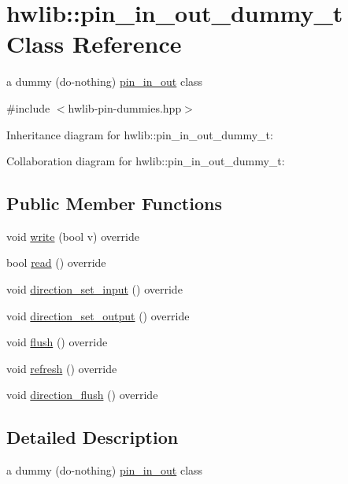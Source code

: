 \hypertarget{classhwlib_1_1pin__in__out__dummy__t}{}\section{hwlib\+:\+:pin\+\_\+in\+\_\+out\+\_\+dummy\+\_\+t Class Reference}
\label{classhwlib_1_1pin__in__out__dummy__t}


a dummy (do-\/nothing) \hyperlink{classhwlib_1_1pin__in__out}{pin\+\_\+in\+\_\+out} class  




{\ttfamily \#include $<$hwlib-\/pin-\/dummies.\+hpp$>$}



Inheritance diagram for hwlib\+:\+:pin\+\_\+in\+\_\+out\+\_\+dummy\+\_\+t\+:


Collaboration diagram for hwlib\+:\+:pin\+\_\+in\+\_\+out\+\_\+dummy\+\_\+t\+:
\subsection*{Public Member Functions}
\begin{DoxyCompactItemize}
\item 
void \hyperlink{classhwlib_1_1pin__in__out__dummy__t_ae5ed2ec46aee911a4c3827688cbf72b8}{write} (bool v) override
\item 
bool \hyperlink{classhwlib_1_1pin__in__out__dummy__t_a6cc3d99badf70aae8b076594ffd5f465}{read} () override
\item 
void \hyperlink{classhwlib_1_1pin__in__out__dummy__t_af5f3e57b6496dc0e523fe6000e2caefc}{direction\+\_\+set\+\_\+input} () override
\item 
void \hyperlink{classhwlib_1_1pin__in__out__dummy__t_a065ca763bd00d4cd6bf3fd11610779db}{direction\+\_\+set\+\_\+output} () override
\item 
void \hyperlink{classhwlib_1_1pin__in__out__dummy__t_ab799d24ac3180d3d7e97512410ef9994}{flush} () override
\item 
void \hyperlink{classhwlib_1_1pin__in__out__dummy__t_a7553d2ee2e380a7156655c725dd71e71}{refresh} () override
\item 
void \hyperlink{classhwlib_1_1pin__in__out__dummy__t_ad33911be9133dd967220eac92b232c78}{direction\+\_\+flush} () override
\end{DoxyCompactItemize}


\subsection{Detailed Description}
a dummy (do-\/nothing) \hyperlink{classhwlib_1_1pin__in__out}{pin\+\_\+in\+\_\+out} class 

